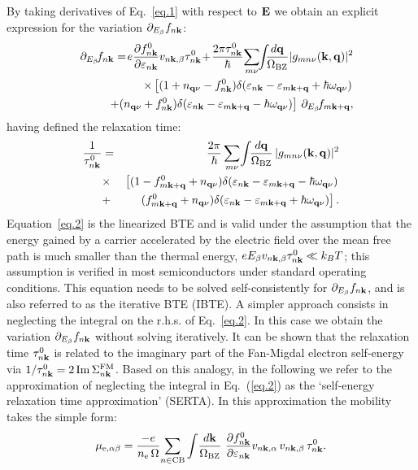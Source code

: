 \documentclass[aps,prl,twocolumn,superscriptaddress]{revtex4-1}
\begin{document}
By taking derivatives of Eq.~\eqref{eq.1} with respect to ${\bf E}$ we obtain an explicit
expression for the variation $\partial_{E_{\beta}} f_{n{\bf k}}$:
  \begin{eqnarray}\label{eq.2}
  &&  \D_{E_\b}\!f_{n\bk} = \! e \frac{\partial f_{n\bk}^0}{\partial \varepsilon_{n\mathbf{k}}} v_{n\bk,\b} \tau_{n\bk}^0
\!+ \!\frac{2\pi\tau_{n\bk}^0}{\hbar}\!
     \sum_{m\nu}\!\!\int\!\!\!\frac{d\bq}{\Omega_{\rm BZ}} |g_{mn\nu}(\bk,\bq)|^2  \nonumber \\ 
   &&\quad   \times \left[ (1+n_{\bq\nu} - f_{n\bk}^0) \d(\ve_{n\bk}-\ve_{m\bk+\bq} + \hbar\w_{\bq\nu})  \nonumber \right. \\   
   &&\left. \quad  + (n_{\bq\nu} + f_{n\bk}^0)  \d(\ve_{n\bk}-\ve_{m\bk+\bq} - \hbar\w_{\bq\nu})\right]\,\D_{E_\b}\!f_{m\bk+\bq}, 
  \end{eqnarray}
having defined the relaxation time: 
  \begin{eqnarray}\label{eq.3}
  \frac{1}{\tau_{n{\bf k}}^{0}} &=& \frac{2\pi}{\hbar} \sum_{m\nu}\!\int\!\!\frac{d{\bf q}}{\Omega_{\rm BZ}} \, |g_{mn\nu}({\bf k},{\bf q})|^2  \nonumber \\
  &\times& \left[(1-f_{m{\bf k}+{\bf q}}^0 +n_{{\bf q}\nu}) \delta({\varepsilon}_{n{\bf k}}-{\varepsilon}_{m{\bf k}+{\bf q}} - \hbar\omega_{{\bf q}\nu}) \right. 
   \nonumber \\
  &+& \left. (f_{m{\bf k}+{\bf q}}^0+n_{{\bf q}\nu}) \delta({\varepsilon}_{n{\bf k}}-{\varepsilon}_{m{\bf k}+{\bf q}} + \hbar\omega_{{\bf q}\nu})\right].    
  \end{eqnarray}
Equation~\eqref{eq.2} is the linearized BTE and is valid under the assumption that the energy
gained by a carrier accelerated by the electric field over the mean free path is much smaller
than the thermal energy, $e E_{\beta} v_{n{\bf k},{\beta}} \tau_{n{\bf k}}^0 \ll k_B T$;
this assumption is verified in most semiconductors under standard operating conditions. 
This equation needs to be solved 
self-consistently for $\partial_{E_{\beta}} f_{n{\bf k}}$, and is also referred to as the iterative BTE (IBTE). A simpler 
approach consists in neglecting the integral on the r.h.s. of Eq.~\eqref{eq.2}. In this case we 
obtain the variation $\partial_{E_{\beta}} f_{n{\bf k}}$ without solving iteratively. 
It can be shown that the relaxation time $\tau_{n{\bf k}}^{0}$ is related to the imaginary part of the Fan-Migdal electron 
self-energy~\cite{Giustino2017} via $1/\tau_{n{\bf k}}^{0} = 2 \,{\rm Im}\,
\Sigma_{n{\bf k}}^{\rm FM}$. 
Based on this analogy, in the following we refer to the approximation of 
neglecting the integral in Eq.~(\ref{eq.2}) as the `self-energy relaxation time approximation' (SERTA). 
In this approximation the mobility takes the simple form: 
  \begin{equation}\label{eq.4}
  \mu_{{\rm e},{\alpha}{\beta}} = \frac{-e}{n_{\rm e}\,\Omega}\!\sum_{n\in {\rm CB}} 
  \int \!\frac{d{\bf k}}{\Omega_{\rm BZ}}\,\, \frac{\partial f_{n{\bf k}}^0}{\partial \varepsilon_{n{\bf k}}} v_{n{\bf k},{\alpha}} \,v_{n{\bf k},{\beta}}\,\tau_{n{\bf k}}^{0}.
  \end{equation}
\end{document}
